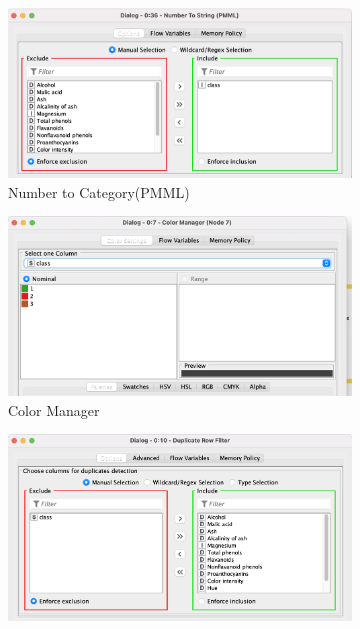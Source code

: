 \documentclass[11pt]{article}
\begin{document}
			\begin{figure}[H]
				\centering
				\begin{subfigure}{0.4\textwidth}
					\includegraphics[width=\textwidth]{res/t1/t11/t11-number-to-cat-conf}
					\caption{Number to Category(PMML)}
					\label{fig:first}
				\end{subfigure}
				\hfill
				\begin{subfigure}{0.4\textwidth}
					\includegraphics[width=\textwidth]{res/t1/t11/t11-color-manager-conf}
					\caption{Color Manager}
					\label{fig:second}
				\end{subfigure}
				\hfill
				\begin{subfigure}{0.4\textwidth}
					\includegraphics[width=\textwidth]{res/t1/t11/t11-duplicate-row-conf}

\end{subfigure}
\end{figure}
\end{document}

